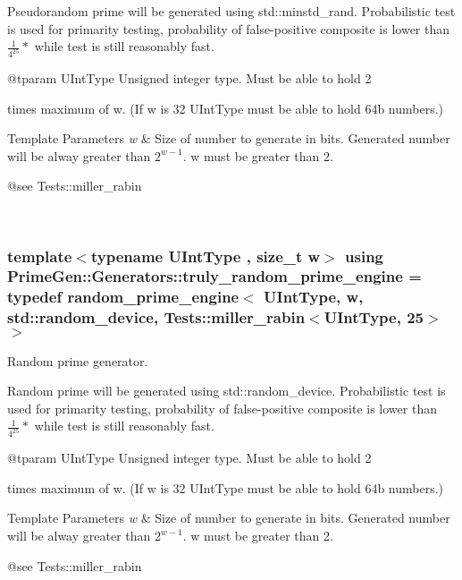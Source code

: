 Pseudorandom prime will be generated using {\ttfamily std\+::minstd\+\_\+rand}. Probabilistic test is used for primarity testing, probability of false-\/positive composite is lower than $ \frac{1}{4^{25}} *$ while test is still reasonably fast. \begin{DoxyVerb}        @tparam UIntType Unsigned integer type. Must be able to hold 2
\end{DoxyVerb}
 times maximum of {\ttfamily w}. (If {\ttfamily w} is 32 {\ttfamily U\+Int\+Type} must be able to hold 64b numbers.) 
\begin{DoxyTemplParams}{Template Parameters}
{\em w} & Size of number to generate in bits. Generated number will be alway greater than $ 2^{w-1} $. {\ttfamily w} must be greater than 2. \begin{DoxyVerb}        @see Tests::miller_rabin\end{DoxyVerb}
 \\
\hline
\end{DoxyTemplParams}
\hypertarget{namespace_prime_gen_1_1_generators_ab2949ed1231e1fe0166367456a32a746}{
\subsubsection[{truly\+\_\+random\+\_\+prime\+\_\+engine}]{\setlength{\rightskip}{0pt plus 5cm}template$<$typename U\+Int\+Type , size\+\_\+t w$>$ using {\bf Prime\+Gen\+::\+Generators\+::truly\+\_\+random\+\_\+prime\+\_\+engine} = typedef {\bf random\+\_\+prime\+\_\+engine}$<$ U\+Int\+Type, w, std\+::random\+\_\+device, {\bf Tests\+::miller\+\_\+rabin}$<$U\+Int\+Type, 25$>$ $>$}}\label{namespace_prime_gen_1_1_generators_ab2949ed1231e1fe0166367456a32a746}


Random prime generator. 

Random prime will be generated using {\ttfamily std\+::random\+\_\+device}. Probabilistic test is used for primarity testing, probability of false-\/positive composite is lower than $ \frac{1}{4^{25}} *$ while test is still reasonably fast. \begin{DoxyVerb}        @tparam UIntType Unsigned integer type. Must be able to hold 2
\end{DoxyVerb}
 times maximum of {\ttfamily w}. (If {\ttfamily w} is 32 {\ttfamily U\+Int\+Type} must be able to hold 64b numbers.) 
\begin{DoxyTemplParams}{Template Parameters}
{\em w} & Size of number to generate in bits. Generated number will be alway greater than $ 2^{w-1} $. {\ttfamily w} must be greater than 2. \begin{DoxyVerb}        @see Tests::miller_rabin\end{DoxyVerb}
 \\
\hline
\end{DoxyTemplParams}


